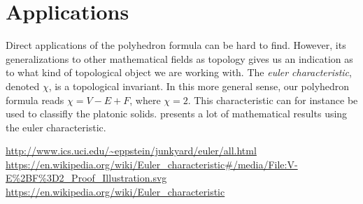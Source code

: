 \documentclass{amsart}
\theoremstyle{plain}
\theoremstyle{definition}
\begin{document}
\section{Applications}
\label{sec:applications}

Direct applications of the polyhedron formula can be hard to find. However, its
generalizations to other mathematical fields as topology gives us an indication
as to what kind of topological object we are working with. The \emph{euler
characteristic}, denoted $\chi$, is a topological invariant. In this more
general sense, our polyhedron formula reads $\chi = V - E + F$, where $\chi =
2$. This characteristic can for instance be used to classifly the platonic
solids. \cite{chi} presents a lot of mathematical results using the euler
characteristic.

\begin{thebibliography}{2}
        \url{http://www.ics.uci.edu/~eppstein/junkyard/euler/all.html}
        \url{https://en.wikipedia.org/wiki/Euler_characteristic#/media/File:V-E%2BF%3D2_Proof_Illustration.svg}
        \url{https://en.wikipedia.org/wiki/Euler_characteristic}
\end{thebibliography}
\end{document}
